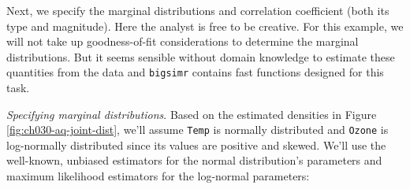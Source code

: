 \documentclass[]{article}
\newenvironment{Shaded}{\begin{snugshade}}{\end{snugshade}}
\newcommand{\ControlFlowTok}[1]{\textcolor[rgb]{0.13,0.29,0.53}{\textbf{#1}}}
\newcommand{\DataTypeTok}[1]{\textcolor[rgb]{0.13,0.29,0.53}{#1}}
\newcommand{\DecValTok}[1]{\textcolor[rgb]{0.00,0.00,0.81}{#1}}
\newcommand{\FloatTok}[1]{\textcolor[rgb]{0.00,0.00,0.81}{#1}}
\newcommand{\KeywordTok}[1]{\textcolor[rgb]{0.13,0.29,0.53}{\textbf{#1}}}
\newcommand{\NormalTok}[1]{#1}
\newcommand{\OperatorTok}[1]{\textcolor[rgb]{0.81,0.36,0.00}{\textbf{#1}}}
\newcommand{\StringTok}[1]{\textcolor[rgb]{0.31,0.60,0.02}{#1}}
\begin{document}
Next, we specify the marginal distributions and correlation coefficient (both its type and magnitude).
Here the analyst is free to be creative.
For this example, we will not take up goodness-of-fit considerations to determine the marginal distributions.
But it seems sensible without domain knowledge to estimate these quantities from the data and \texttt{bigsimr} contains fast functions designed for this task.

\emph{Specifying marginal distributions}.
Based on the estimated densities in Figure \ref{fig:ch030-aq-joint-dist}, we'll assume \texttt{Temp} is normally distributed and \texttt{Ozone} is log-normally distributed since its values are positive and skewed.
We'll use the well-known, unbiased estimators for the normal distribution's parameters and maximum likelihood estimators for the log-normal parameters:

\begin{Shaded}
\end{Shaded}

\begin{Shaded}
\end{Shaded}
\end{document}

